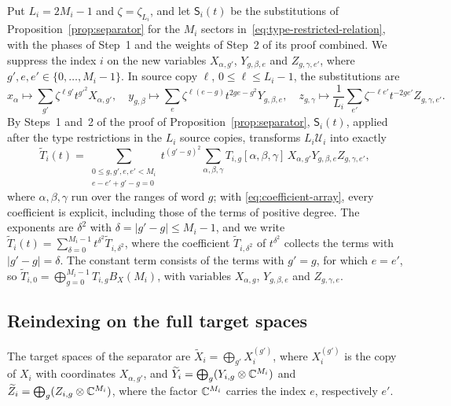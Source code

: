Put \(L_i=2M_i-1\) and \(\zeta=\zeta_{L_i}\), and let \(\mathsf S_i(t)\)
be the substitutions of Proposition~\ref{prop:separator} for the \(M_i\)
sectors in~\eqref{eq:type-restricted-relation}, with the phases of Step~1
and the weights of Step~2 of its proof combined. We suppress the index
\(i\) on the new variables \(X_{\alpha,g'}\), \(Y_{g,\beta,e}\) and
\(Z_{g,\gamma,e'}\), where \(g',e,e'\in\{0,\ldots,M_i-1\}\). In source copy
\(\ell\), \(0\le\ell\le L_i-1\), the substitutions are
\[
 x_\alpha\mapsto\sum_{g'}\zeta^{\ell g'}t^{g'^2}X_{\alpha,g'},\quad
 y_{g,\beta}\mapsto\sum_e\zeta^{\ell(e-g)}t^{2ge-g^2}Y_{g,\beta,e},\quad
 z_{g,\gamma}\mapsto\frac1{L_i}\sum_{e'}\zeta^{-\ell e'}t^{-2ge'}
 Z_{g,\gamma,e'}.
\]
By Steps~1 and~2 of the proof of Proposition~\ref{prop:separator},
\(\mathsf S_i(t)\), applied after the type restrictions in the \(L_i\)
source copies, transforms \(L_i\mathcal U_i\) into exactly
\begin{equation}\label{eq:composed-relation-polynomial}
 \widetilde T_i(t)=
 \sum_{\substack{0\le g,g',e,e'<M_i\\e-e'+g'-g=0}}
 t^{(g'-g)^2}
 \sum_{\alpha,\beta,\gamma}
 T_{i,g}[\alpha,\beta,\gamma]\,
 X_{\alpha,g'}Y_{g,\beta,e}Z_{g,\gamma,e'},
\end{equation}
where \(\alpha,\beta,\gamma\) run over the ranges of word \(g\); with
\eqref{eq:coefficient-array}, every coefficient is explicit, including
those of the terms of positive degree. The exponents are
\(\delta^2\) with \(\delta=|g'-g|\le M_i-1\), and we write
\(\widetilde T_i(t)=\sum_{\delta=0}^{M_i-1}t^{\delta^2}
\widetilde T_{i,\delta^2}\), where the coefficient
\(\widetilde T_{i,\delta^2}\) of \(t^{\delta^2}\) collects the terms with
\(|g'-g|=\delta\). The constant term consists of
the terms with \(g'=g\), for which \(e=e'\), so
\(\widetilde T_{i,0}=\bigoplus_{g=0}^{M_i-1}T_{i,g}B_X(M_i)\), with
variables \(X_{\alpha,g}\), \(Y_{g,\beta,e}\) and \(Z_{g,\gamma,e}\).

\subsection{Reindexing on the full target spaces}

The target spaces of the separator are
\(\widetilde X_i=\bigoplus_{g'}X_i^{(g')}\), where \(X_i^{(g')}\) is the
copy of \(X_i\) with coordinates \(X_{\alpha,g'}\), and
\(\widetilde Y_i=\bigoplus_g(Y_{i,g}\otimes\mathbb C^{M_i})\) and
\(\widetilde Z_i=\bigoplus_g(Z_{i,g}\otimes\mathbb C^{M_i})\), where the factor
\(\mathbb C^{M_i}\) carries the index \(e\), respectively \(e'\).

